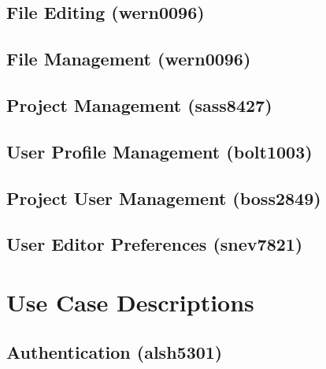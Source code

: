 \documentclass[11pt]{report}
\begin{document}
\subsection{File Editing (wern0096)}
\subsection{File Management (wern0096)}
\subsection{Project Management (sass8427)}
\subsection{User Profile Management (bolt1003)}
\subsection{Project User Management (boss2849)} 
\subsection{User Editor Preferences (snev7821)}

\section{Use Case Descriptions}
\subsection{Authentication (alsh5301)}
\end{document}
